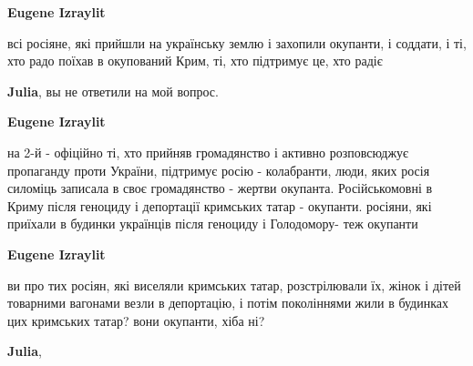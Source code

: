 \begin{itemize}
\begin{itemize}
 
\textbf{Eugene Izraylit} 

всі росіяне, які прийшли на українську землю і захопили окупанти, і соддати, і
ті, хто радо поїхав в окупований Крим, ті, хто підтримує це, хто радіє

 
\textbf{Julia}, вы не ответили на мой вопрос.

 
\textbf{Eugene Izraylit} 

на 2-й - офіційно ті, хто прийняв громадянство і активно розповсюджує
пропаганду проти України, підтримує росію - колабранти, люди, яких росія
силоміць записала в своє громадянство - жертви окупанта. Російськомовні в Криму
після геноциду і депортації кримських татар - окупанти. росіяни, які приїхали в
будинки українців після геноциду і Голодомору- теж окупанти


 
\textbf{Eugene Izraylit} 

ви про тих росіян, які виселяли кримських татар, розстрілювали їх, жінок і
дітей товарними вагонами везли в депортацію, і потім поколіннями жили в
будинках цих кримських татар? вони окупанти, хіба ні?

 
\textbf{Julia}, 


\end{itemize}
\end{itemize}
